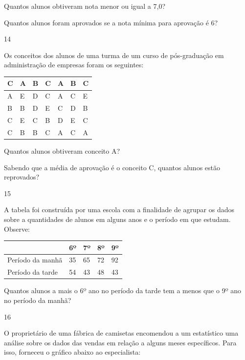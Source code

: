 \begin{escolha}
\begin{escolha}
\item
  Quantos alunos obtiveram nota menor ou igual a 7,0?

\item
  Quantos alunos foram aprovados se a nota mínima para aprovação é 6?
\end{escolha}

\num{14}

Os conceitos dos alunos de uma turma de um curso de pós-graduação em
administração de empresas foram os seguintes:

\begin{longtable}[]{@{}lllllll@{}}
\toprule
C & A & B & C & A & B & C\tabularnewline
\midrule
\endhead
A & E & D & C & A & C & E\tabularnewline
B & B & D & E & C & D & B\tabularnewline
C & E & C & B & D & E & C\tabularnewline
C & B & B & C & A & C & A\tabularnewline
\bottomrule
\end{longtable}

\begin{escolha}
\item
  Quantos alunos obtiveram conceito A?

\item
  Sabendo que a média de aprovação é o conceito C, quantos alunos estão
  reprovados?
\end{escolha}

\num{15}

A tabela foi construída por uma escola com a finalidade de agrupar os
dados sobre a quantidades de alunos em alguns anos e o período em que
estudam. Observe:

\begin{longtable}[]{@{}lllll@{}}
\toprule
& 6º & 7º & 8º & 9º\tabularnewline
\midrule
\endhead
Período da manhã & 35 & 65 & 72 & 92\tabularnewline
Período da tarde & 54 & 43 & 48 & 43\tabularnewline
\bottomrule
\end{longtable}

Quantos alunos a mais o 6º ano no período da tarde tem a menos que o 9º
ano no período da manhã?


\num{16}

O proprietário de uma fábrica de camisetas encomendou a um estatístico
uma análise sobre os dados das vendas em relação a alguns meses
específicos. Para isso, forneceu o gráfico abaixo ao especialista:


\end{escolha}
